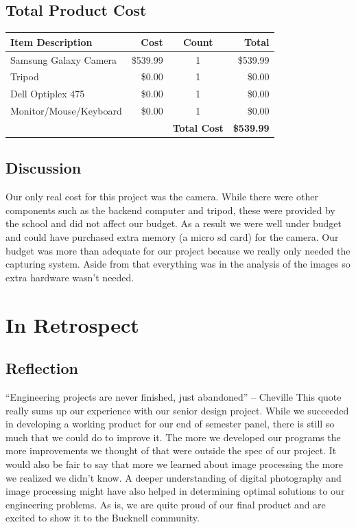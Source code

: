 \documentclass[]{article}
\begin{document}
		\subsection{Total Product Cost}
		
			\begin{tabular}{ | l | r | c | r |}
				\hline
				Item Description & Cost & Count & Total \\
				\hline
				Samsung Galaxy Camera & \$539.99 & 1 & \$539.99 \\
				\hline
				Tripod & \$0.00 & 1 & \$0.00\\
				\hline
				Dell Optiplex 475 & \$0.00 & 1 & \$0.00 \\
				\hline
				Monitor/Mouse/Keyboard & \$0.00 & 1 & \$0.00\\
				\hline
				& & \textbf{Total Cost} & \textbf{\$539.99}\\
				\hline
			\end{tabular}
		
		\subsection{Discussion}
			Our only real cost for this project was the camera. While there were other components such as the backend computer and tripod, these were provided by the school and did not affect our budget. As a result we were well under budget and could have purchased extra memory (a micro sd card) for the camera. Our budget was more than adequate for our project because we really only needed the capturing system. Aside from that everything was in the analysis of the images so extra hardware wasn’t needed.
			
	\section{In Retrospect}
	
		\subsection{Reflection}
		
			“Engineering projects are never finished, just abandoned” – Cheville
			This quote really sums up our experience with our senior design project. While we succeeded in developing a working product for our end of semester panel, there is still so much that we could do to improve it. The more we developed our programs the more improvements we thought of that were outside the spec of our project. It would also be fair to say that more we learned about image processing the more we realized we didn’t know. A deeper understanding of digital photography and image processing might have also helped in determining optimal solutions to our engineering problems. As is, we are quite proud of our final product and are excited to show it to the Bucknell community.
\end{document}

